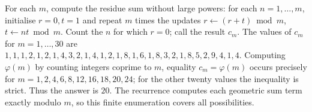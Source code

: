 For each $m$, compute the residue sum without large powers: for each $n=1,\ldots,m$, initialise $r=0,t=1$ and repeat $m$ times the updates $r\leftarrow(r+t)\bmod m$, $t\leftarrow nt\bmod m$. Count the $n$ for which $r=0$; call the result $c_m$. The values of $c_m$ for $m=1,\ldots,30$ are $1,1,1,2,1,2,1,4,3,2,1,4,1,2,1,8,1,6,1,8,3,2,1,8,5,2,9,4,1,4$. Computing $\varphi(m)$ by counting integers coprime to $m$, equality $c_m=\varphi(m)$ occurs precisely for $m=1,2,4,6,8,12,16,18,20,24$; for the other twenty values the inequality is strict. Thus the answer is $\boxed{20}$. The recurrence computes each geometric sum term exactly modulo $m$, so this finite enumeration covers all possibilities.

